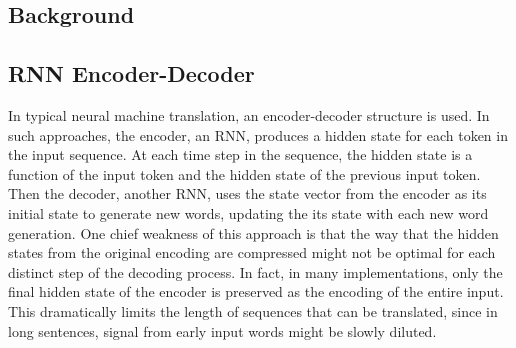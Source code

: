 \documentclass[letterpaper, 11pt]{article}
\begin{document}
\begin{multicols}{2}

\section{Background}
\subsection{RNN Encoder-Decoder}

In typical neural machine translation, an encoder-decoder structure is used.
In such approaches, the encoder, an RNN, produces a hidden state for each token in the input
sequence.
At each time step in the sequence, the hidden state is a function of the input token and the hidden
state of the previous input token.
Then the decoder, another RNN, uses the state vector from the encoder as its initial state to
generate new words, updating the its state with each new word generation.
One chief weakness of this approach is that the way that the hidden states from the original
encoding are compressed might not be optimal for each distinct step of the decoding process.
In fact, in many implementations, only the final hidden state of the encoder is preserved as the
encoding of the entire input.
This dramatically limits the length of sequences that can be translated, since in long sentences,
signal from early input words might be slowly diluted.


\end{multicols}
\end{document}
